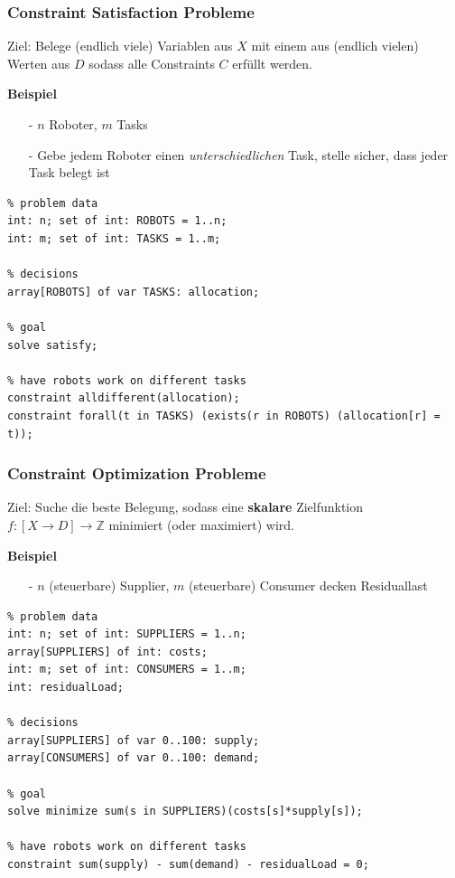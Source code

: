 \begin{frame}[fragile]
\frametitle{Constraint Satisfaction Probleme}

\vspace*{5ex}

\alert{Ziel:} Belege (endlich viele) Variablen aus $X$ mit einem aus (endlich vielen) Werten aus $D$ sodass alle Constraints $C$ erfüllt werden.

\vspace*{1ex}

\textbf{Beispiel}
\begin{itemize}
\item [-] $n$ Roboter, $m$ Tasks
\item [-] Gebe jedem Roboter einen \emph{unterschiedlichen} Task, stelle sicher, dass jeder Task belegt ist 
\end{itemize}

\begin{lstlisting}
% problem data 
int: n; set of int: ROBOTS = 1..n;
int: m; set of int: TASKS = 1..m;

% decisions
array[ROBOTS] of var TASKS: allocation;

% goal
solve satisfy;

% have robots work on different tasks
constraint alldifferent(allocation);
constraint forall(t in TASKS) (exists(r in ROBOTS) (allocation[r] = t));
\end{lstlisting}
\end{frame}

\begin{frame}[fragile]
\frametitle{Constraint Optimization Probleme}

\vspace*{4ex}

\alert{Ziel:} Suche die beste Belegung, sodass eine \textbf{skalare} Zielfunktion $f : [X \to D] \to \mathbb{Z}$ minimiert (oder maximiert) wird.

\vspace*{1ex}

\textbf{Beispiel}
\begin{itemize}
\item [-] $n$ (steuerbare) Supplier, $m$ (steuerbare) Consumer decken Residuallast
\end{itemize}

\begin{lstlisting}
% problem data 
int: n; set of int: SUPPLIERS = 1..n;
array[SUPPLIERS] of int: costs;
int: m; set of int: CONSUMERS = 1..m;
int: residualLoad;

% decisions
array[SUPPLIERS] of var 0..100: supply;
array[CONSUMERS] of var 0..100: demand;

% goal
solve minimize sum(s in SUPPLIERS)(costs[s]*supply[s]);

% have robots work on different tasks
constraint sum(supply) - sum(demand) - residualLoad = 0; 
\end{lstlisting}
\end{frame}

